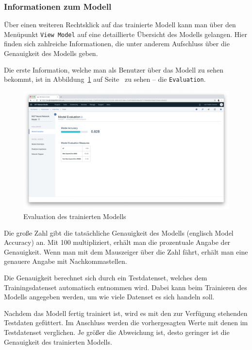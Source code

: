 \subsubsection{Informationen zum Modell}
Über einen weiteren Rechtsklick auf das trainierte Modell kann man über den Menüpunkt \texttt{View Model} auf eine
detaillierte Übersicht des Modells gelangen. Hier finden sich zahlreiche Informationen, die unter anderem Aufschluss
über die Genauigkeit des Modells geben.

Die erste Information, welche man als Benutzer über das Modell zu sehen bekommt, ist in
Abbildung~\ref{fig:umsetzung_model_evaluation} auf Seite~\pageref{fig:umsetzung_model_evaluation} zu sehen -- die
\texttt{Evaluation}.

\begin{figure}[h]
    \centering
    \includegraphics[width=\textwidth]{images/kapitel_3/model_evaluation.png}
    \caption{Evaluation des trainierten Modells}
    \label{fig:umsetzung_model_evaluation}
\end{figure}

Die große Zahl gibt die tatsächliche Genauigkeit des Modells (englisch Model Accuracy) an. Mit 100 multipliziert, erhält
man die prozentuale Angabe der Genauigkeit. Wenn man mit dem Mauszeiger über die Zahl fährt, erhält man eine genauere
Angabe mit Nachkommastellen.

Die Genauigkeit berechnet sich durch ein Testdatenset, welches dem Trainingsdatenset automatisch entnommen wird. Dabei
kann beim Trainieren des Modells angegeben werden, um wie viele Datenset es sich handeln soll.

Nachdem das Modell fertig trainiert ist, wird es mit den zur Verfügung stehenden Testdaten gefüttert. Im Anschluss
werden die vorhergesagten Werte mit denen im Testdatenset verglichen. Je größer die Abweichung ist, desto geringer ist
die Genauigkeit des trainierten Modells.

